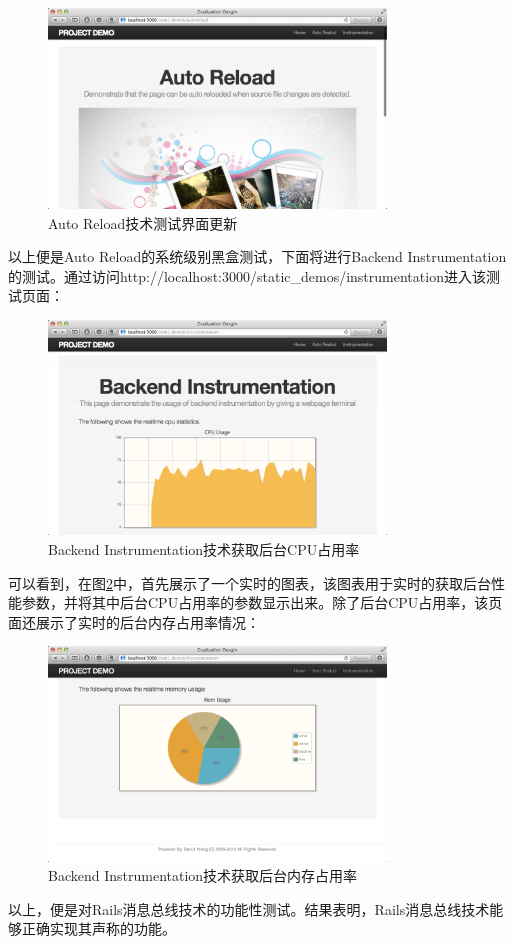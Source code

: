 \begin{figure}[h]
\centering
\includegraphics[width=0.8\textwidth]{images/test/5.png}
\caption{Auto Reload技术测试界面更新}
\label{fig-step5}
\end{figure}

以上便是Auto Reload的系统级别黑盒测试，下面将进行Backend Instrumentation的测试。通过访问http://localhost:3000/static\_demos/instrumentation进入该测试页面：

\begin{figure}[h]
\centering
\includegraphics[width=0.8\textwidth]{images/test/6.png}
\caption{Backend Instrumentation技术获取后台CPU占用率}
\label{fig-step6}
\end{figure}

可以看到，在图\ref{fig-step6}中，首先展示了一个实时的图表，该图表用于实时的获取后台性能参数，并将其中后台CPU占用率的参数显示出来。除了后台CPU占用率，该页面还展示了实时的后台内存占用率情况：

\begin{figure}[h]
\centering
\includegraphics[width=0.8\textwidth]{images/test/7.png}
\caption{Backend Instrumentation技术获取后台内存占用率}
\label{fig-step7}
\end{figure}

以上，便是对Rails消息总线技术的功能性测试。结果表明，Rails消息总线技术能够正确实现其声称的功能。


